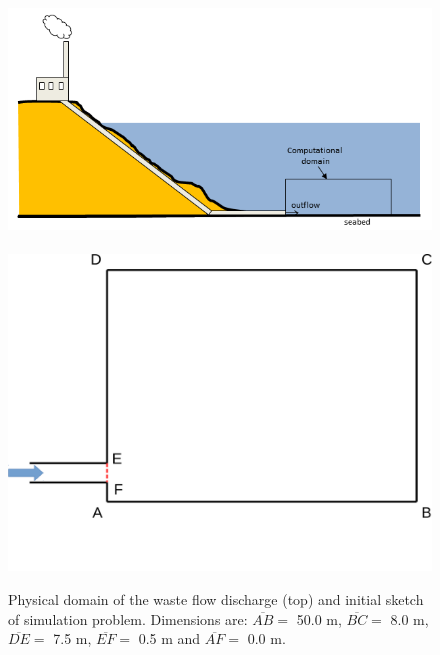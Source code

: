 \documentclass[12pts,a4paper,amsmath,amssymb,floatfix]{article}%
\begin{document}
\begin{enumerate}[label=\bfseries Problem \arabic*:]
\begin{figure}[h]
\vbox{\hbox{\hspace{2cm}
\includegraphics[width=13.cm,height=8.cm,clip]{./Pics/problem_sketch.png}}
\vspace{-0.cm}
\hbox{\hspace{3cm}
\includegraphics[width=10.cm,height=6.cm,clip]{./Pics/Sketch_Prob2b}}}\vspace{-1.5cm}
\caption{Physical domain of the waste flow discharge (top) and initial sketch of simulation problem. Dimensions are: $\overline{AB}=$ 50.0 m, $\overline{BC}=$ 8.0 m, $\overline{DE}=$ 7.5 m, $\overline{EF}=$ 0.5 m and $\overline{AF}=$ 0.0 m.} \label{EG501V_Assignment:Sketch2}
\end{figure}



\end{enumerate}
\end{document}
